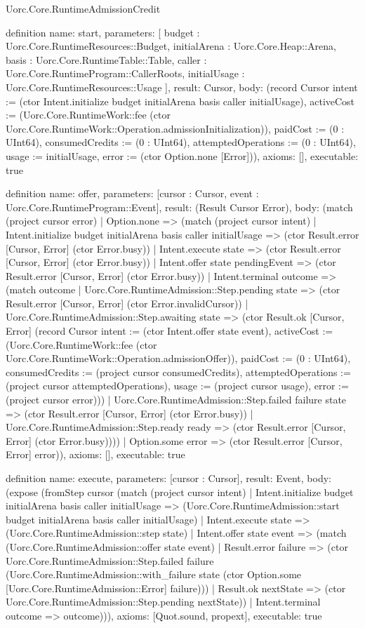 \begin{lexlean}{Uorc.Core.RuntimeAdmissionCredit}
\begin{semanticmodule}
definition{
  name: start,
  parameters: [
    budget : Uorc.Core.RuntimeResources::Budget,
    initialArena : Uorc.Core.Heap::Arena,
    basis : Uorc.Core.RuntimeTable::Table,
    caller : Uorc.Core.RuntimeProgram::CallerRoots,
    initialUsage : Uorc.Core.RuntimeResources::Usage
  ],
  result: Cursor,
  body: (record Cursor {intent := (ctor Intent.initialize budget initialArena basis caller initialUsage), activeCost := (Uorc.Core.RuntimeWork::fee (ctor Uorc.Core.RuntimeWork::Operation.admissionInitialization)), paidCost := (0 : UInt64), consumedCredits := (0 : UInt64), attemptedOperations := (0 : UInt64), usage := initialUsage, error := (ctor Option.none [Error])}),
  axioms: [],
  executable: true
}

definition{
  name: offer,
  parameters: [cursor : Cursor, event : Uorc.Core.RuntimeProgram::Event],
  result: (Result Cursor Error),
  body: (match (project cursor error)
    | Option.none => (match (project cursor intent)
      | Intent.initialize budget initialArena basis caller initialUsage => (ctor Result.error [Cursor, Error] (ctor Error.busy))
      | Intent.execute state => (ctor Result.error [Cursor, Error] (ctor Error.busy))
      | Intent.offer state pendingEvent => (ctor Result.error [Cursor, Error] (ctor Error.busy))
      | Intent.terminal outcome => (match outcome
        | Uorc.Core.RuntimeAdmission::Step.pending state => (ctor Result.error [Cursor, Error] (ctor Error.invalidCursor))
        | Uorc.Core.RuntimeAdmission::Step.awaiting state => (ctor Result.ok [Cursor, Error] (record Cursor {intent := (ctor Intent.offer state event), activeCost := (Uorc.Core.RuntimeWork::fee (ctor Uorc.Core.RuntimeWork::Operation.admissionOffer)), paidCost := (0 : UInt64), consumedCredits := (project cursor consumedCredits), attemptedOperations := (project cursor attemptedOperations), usage := (project cursor usage), error := (project cursor error)}))
        | Uorc.Core.RuntimeAdmission::Step.failed failure state => (ctor Result.error [Cursor, Error] (ctor Error.busy))
        | Uorc.Core.RuntimeAdmission::Step.ready ready => (ctor Result.error [Cursor, Error] (ctor Error.busy))))
    | Option.some error => (ctor Result.error [Cursor, Error] error)),
  axioms: [],
  executable: true
}

definition{
  name: execute,
  parameters: [cursor : Cursor],
  result: Event,
  body: (expose (fromStep cursor (match (project cursor intent)
    | Intent.initialize budget initialArena basis caller initialUsage => (Uorc.Core.RuntimeAdmission::start budget initialArena basis caller initialUsage)
    | Intent.execute state => (Uorc.Core.RuntimeAdmission::step state)
    | Intent.offer state event => (match (Uorc.Core.RuntimeAdmission::offer state event)
      | Result.error failure => (ctor Uorc.Core.RuntimeAdmission::Step.failed failure (Uorc.Core.RuntimeAdmission::with_failure state (ctor Option.some [Uorc.Core.RuntimeAdmission::Error] failure)))
      | Result.ok nextState => (ctor Uorc.Core.RuntimeAdmission::Step.pending nextState))
    | Intent.terminal outcome => outcome))),
  axioms: [Quot.sound, propext],
  executable: true
}


\end{semanticmodule}
\end{lexlean}
